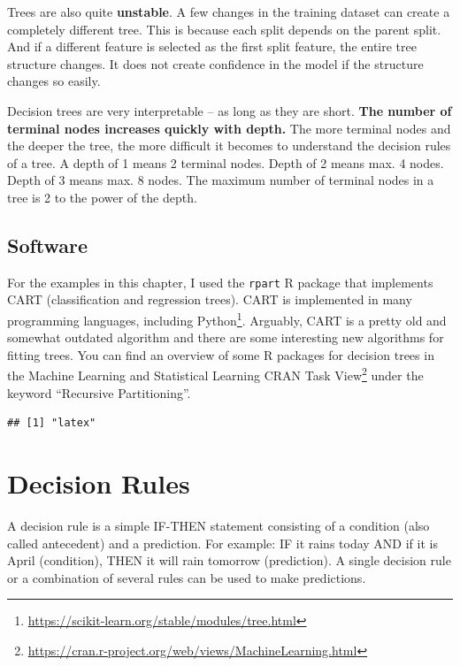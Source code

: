 \documentclass[
  11pt,
]{scrbook}
\renewcommand{\href}[2]{#2\footnote{\url{#1}}}
\begin{document}
Trees are also quite \textbf{unstable}.
A few changes in the training dataset can create a completely different tree.
This is because each split depends on the parent split.
And if a different feature is selected as the first split feature, the entire tree structure changes.
It does not create confidence in the model if the structure changes so easily.

Decision trees are very interpretable -- as long as they are short.
\textbf{The number of terminal nodes increases quickly with depth.}
The more terminal nodes and the deeper the tree, the more difficult it becomes to understand the decision rules of a tree.
A depth of 1 means 2 terminal nodes.
Depth of 2 means max. 4 nodes.
Depth of 3 means max. 8 nodes.
The maximum number of terminal nodes in a tree is 2 to the power of the depth.

\hypertarget{software-2}{%
\subsection{Software}\label{software-2}}

For the examples in this chapter, I used the \texttt{rpart} R package that implements CART (classification and regression trees).
CART is implemented in many programming languages, including \href{https://scikit-learn.org/stable/modules/tree.html}{Python}.
Arguably, CART is a pretty old and somewhat outdated algorithm and there are some interesting new algorithms for fitting trees.
You can find an overview of some R packages for decision trees in the \href{https://cran.r-project.org/web/views/MachineLearning.html}{Machine Learning and Statistical Learning CRAN Task View} under the keyword ``Recursive Partitioning''.

\begin{verbatim}
## [1] "latex"
\end{verbatim}

\newpage

\hypertarget{rules}{%
\section{Decision Rules}\label{rules}}

A decision rule is a simple IF-THEN statement consisting of a condition (also called antecedent) and a prediction.
For example:
IF it rains today AND if it is April (condition), THEN it will rain tomorrow (prediction).
A single decision rule or a combination of several rules can be used to make predictions.
\end{document}
